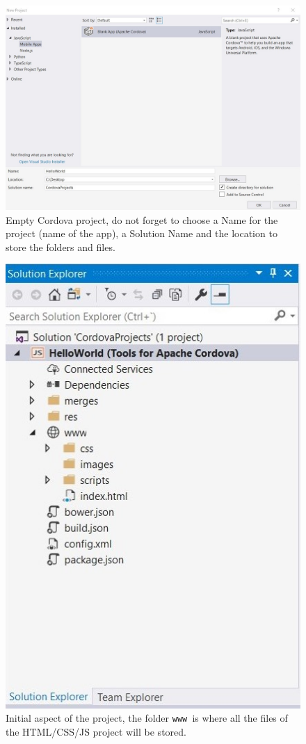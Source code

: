 \begin{figure}
    \centering
    \includegraphics[width= 0.9 \textwidth]{Figures/Cordova2}
    \caption{Empty Cordova project, do not forget to choose a Name for the project (name of the app), a Solution Name and the location to store the folders and files.}
    \label{fig:Cordova2}
\end{figure}

\begin{figure}
    \centering
    \includegraphics[width= 0.6 \textwidth]{Figures/Cordova3}
    \caption{Initial aspect of the project, the folder \texttt{www }is where all the files of the HTML/CSS/JS project will be stored.}
    \label{fig:Cordova3}
\end{figure}

